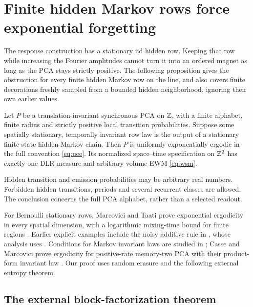 \section{Finite hidden Markov rows force exponential forgetting}\label{sec:hidden-markov}

The response construction has a stationary iid hidden row. Keeping that row while increasing the Fourier amplitudes cannot turn it into an ordered magnet as long as the PCA stays strictly positive. The following proposition gives the obstruction for every finite hidden Markov row on the line, and also covers finite decorations freshly sampled from a bounded hidden neighborhood, ignoring their own earlier values.

\begin{proposition}\label{prop:hidden-markov}
Let \(P\) be a translation-invariant synchronous PCA on \(\mathbb Z\), with a finite alphabet, finite radius and strictly positive local transition probabilities. Suppose some spatially stationary, temporally invariant row law is the output of a stationary finite-state hidden Markov chain. Then \(P\) is uniformly exponentially ergodic in the full convention \eqref{eq:uee}. Its normalized space--time specification on \(\mathbb Z^2\) has exactly one DLR measure and arbitrary-volume EWM \eqref{eq:wsm}.
\end{proposition}

Hidden transition and emission probabilities may be arbitrary real numbers. Forbidden hidden transitions, periods and several recurrent classes are allowed. The conclusion concerns the full PCA alphabet, rather than a selected readout.

For Bernoulli stationary rows, Marcovici and Taati prove exponential ergodicity in every spatial dimension, with a logarithmic mixing-time bound for finite regions \cite{mtBernoulli}. Earlier explicit examples include the noisy additive rule in \cite[Example~2.3]{bmm}, whose analysis uses \cite[Chapters~16--17]{toomChapter}. Conditions for Markov invariant laws are studied in \cite{toomChapter,casseMarckert}; Casse and Marcovici prove ergodicity for positive-rate memory-two PCA with their product-form invariant law \cite[Theorem~8 in the preprint]{casseMarcovici}. Our proof uses random erasure and the following external entropy theorem.

\subsection{The external block-factorization theorem}

